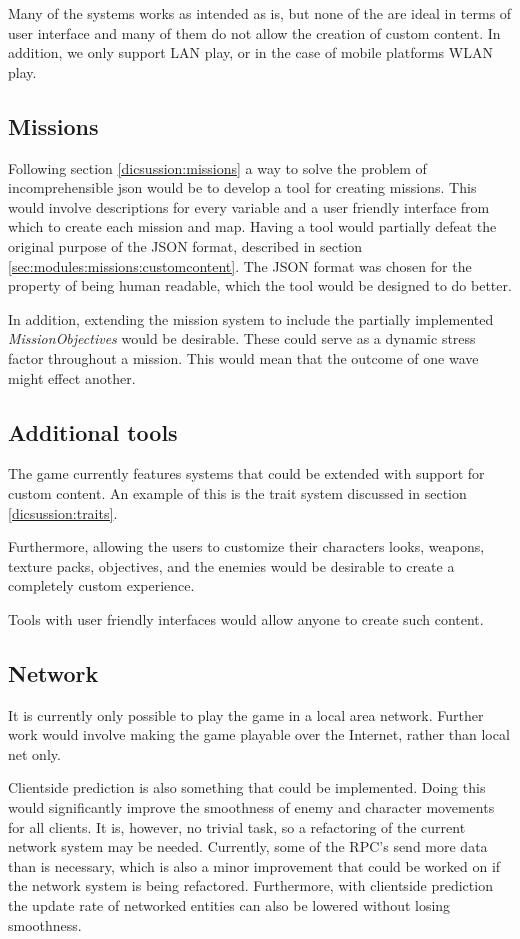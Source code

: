 Many of the systems works as intended as is, but none of the are ideal in terms of user interface and many of them do not allow the creation of custom content.
In addition, we only support LAN play, or in the case of mobile platforms WLAN play.

\subsection{Missions}
Following section \ref{dicsussion:missions} a way to solve the problem of incomprehensible json would be to develop a tool for creating missions.
This would involve descriptions for every variable and a user friendly interface from which to create each mission and map.
Having a tool would partially defeat the original purpose of the JSON format, described in section \ref{sec:modules:missions:customcontent}.
The JSON format was chosen for the property of being human readable, which the tool would be designed to do better.

In addition, extending the mission system to include the partially implemented \textit{MissionObjectives} would be desirable.
These could serve as a dynamic stress factor throughout a mission.
This would mean that the outcome of one wave might effect another.

\subsection{Additional tools}
The game currently features systems that could be extended with support for custom content.
An example of this is the trait system discussed in section \ref{dicsussion:traits}.

Furthermore, allowing the users to customize their characters looks, weapons, texture packs, objectives, and the enemies would be desirable to create a completely custom experience.

Tools with user friendly interfaces would allow anyone to create such content.

\subsection{Network}

It is currently only possible to play the game in a local area network.
Further work would involve making the game playable over the Internet, rather than local net only.

Clientside prediction is also something that could be implemented.
Doing this would significantly improve the smoothness of enemy and character movements for all clients.
It is, however, no trivial task, so a refactoring of the current network system may be needed.
Currently, some of the RPC's send more data than is necessary, which is also a minor improvement that could be worked on if the network system is being refactored.
Furthermore, with clientside prediction the update rate of networked entities can also be lowered without losing smoothness.
